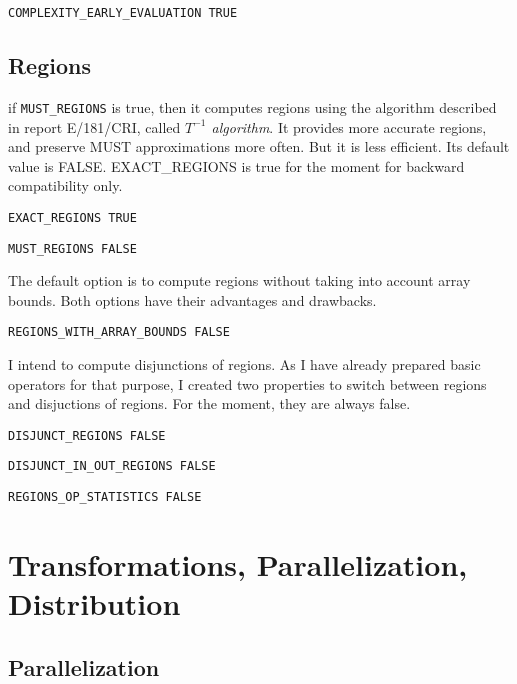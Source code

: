 \begin{verbatim}
COMPLEXITY_EARLY_EVALUATION TRUE
\end{verbatim}

\subsection{Regions}

if {\tt MUST\_REGIONS} is true, then it computes regions using the
algorithm described in report E/181/CRI, called {\em $T^{-1}$
algorithm}. It provides more accurate regions, and preserve MUST
approximations more often. But it is less efficient. Its default value
is FALSE. EXACT\_REGIONS is true for the moment for backward
compatibility only.

\begin{verbatim}
EXACT_REGIONS TRUE
\end{verbatim}

\begin{verbatim}
MUST_REGIONS FALSE
\end{verbatim}

The default option is to compute regions without taking into account array
bounds. Both options have their advantages and drawbacks. 

\begin{verbatim}
REGIONS_WITH_ARRAY_BOUNDS FALSE
\end{verbatim}

I intend to compute disjunctions of regions. As I have already prepared basic
operators for that purpose, I created two properties to switch between regions
and disjuctions of regions. For the moment, they are always false.

\begin{verbatim}
DISJUNCT_REGIONS FALSE
\end{verbatim}

\begin{verbatim}
DISJUNCT_IN_OUT_REGIONS FALSE
\end{verbatim}


\begin{verbatim}
REGIONS_OP_STATISTICS FALSE
\end{verbatim}

\section{Transformations, Parallelization, Distribution}
\label{section-transformations}


\subsection{Parallelization}

